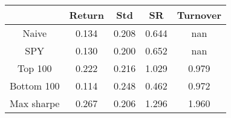 \begin{table}[]
\begin{tabular}{ccccc}
\hline
             & Return   & Std      & SR       & Turnover \\ \hline
Naive        & 0.134 & 0.208 & 0.644 & nan \\
SPY          & 0.130 & 0.200 & 0.652 & nan \\
Top 100      & 0.222 & 0.216 & 1.029 & 0.979 \\
Bottom 100   & 0.114 & 0.248 & 0.462 & 0.972 \\
Max sharpe   & 0.267 & 0.206 & 1.296 & 1.960 \\
\hline
\end{tabular}
\end{table}
